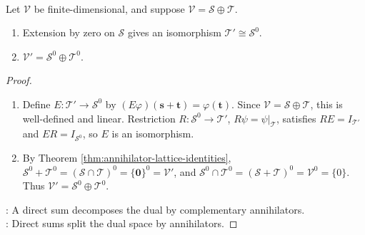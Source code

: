 \begin{theorem} \label{thm:direct-sum-dual-annihilator} \\
Let $\mathcal{V}$ be finite-dimensional, and suppose $\mathcal{V}=\mathcal{S}\oplus\mathcal{T}$.
\begin{enumerate}[label=(\roman*)]
\setlength{\itemsep}{0pt}
\item Extension by zero on $\mathcal{S}$ gives an isomorphism $\mathcal{T}'\cong\mathcal{S}^0$.
\item $\mathcal{V}'=\mathcal{S}^0\oplus\mathcal{T}^0$.
\end{enumerate}
\begin{proof}
\begin{enumerate}[label=(\roman*)]
\setlength{\itemsep}{0pt}
\item Define $E:\mathcal{T}'\to\mathcal{S}^0$ by $(E\varphi)(\mathbf{s}+\mathbf{t})=\varphi(\mathbf{t})$. Since $\mathcal{V}=\mathcal{S}\oplus\mathcal{T}$, this is well-defined and linear. Restriction $R:\mathcal{S}^0\to\mathcal{T}'$, $R\psi=\psi|_{\mathcal{T}}$, satisfies $RE=I_{\mathcal{T}'}$ and $ER=I_{\mathcal{S}^0}$, so $E$ is an isomorphism.
\item By Theorem \ref{thm:annihilator-lattice-identities}, $\mathcal{S}^0+\mathcal{T}^0=(\mathcal{S}\cap\mathcal{T})^0=\{\mathbf{0}\}^0=\mathcal{V}'$, and $\mathcal{S}^0\cap\mathcal{T}^0=(\mathcal{S}+\mathcal{T})^0=\mathcal{V}^0=\{0\}$.\\
Thus $\mathcal{V}'=\mathcal{S}^0\oplus\mathcal{T}^0$.
\end{enumerate}
: A direct sum decomposes the dual by complementary annihilators.\\
: Direct sums split the dual space by annihilators.
\end{proof}
\end{theorem}

